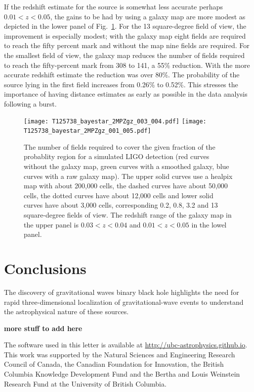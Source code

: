 \documentclass[useAMS,usenatbib]{mn2e}
\begin{document}
If the redshift estimate for the source is somewhat less accurate
perhaps $0.01<z<0.05$, the gains to be had by using a galaxy map are
more modest as depicted in the lower panel of Fig.~\ref{fig:bayestar}.
For the 13 square-degree field of view, the improvement is especially
modest; with the galaxy map eight fields are required to reach the
fifty percent mark and without the map nine fields are required.  For
the smallest field of view, the galaxy map reduces the number of
fields required to reach the fifty-percent mark from 308 to 141, a
55\% reduction.  With the more accurate redshift estimate the
reduction was over 80\%.  The probability of the source lying in the
first field increases from 0.26\% to 0.52\%.  This stresses the
importance of having distance estimates as early as possible in the
data analysis following a burst.
\begin{figure}
  \texttt{[image: T125738\_bayestar\_2MPZgz\_003\_004.pdf]}
  \texttt{[image: T125738\_bayestar\_2MPZgz\_001\_005.pdf]}
  \caption{The number of fields required to cover the given fraction
    of the probablity region for a simulated LIGO detection (red
    curves without the galaxy map, green curves with a smoothed
    galaxy, blue curves with a raw galaxy map).  The upper solid
    curves use a healpix map with about 200,000 cells, the dashed
    curves have about 50,000 cells, the dotted curves have about
    12,000 cells and lower solid curves have about 3,000 cells,
    corresponding 0.2, 0.8, 3.2 and 13 square-degree fields of
    view. The redshift range of the galaxy map in the upper panel is
    $0.03<z<0.04$ and $0.01<z<0.05$ in the lowel panel.}
  \label{fig:bayestar}
\end{figure}

\section{Conclusions}

The discovery of gravitational waves binary black hole highlights the
need for rapid three-dimensional localization of gravitational-wave
events to understand the astrophysical nature of these sources.

{\bf  more stuff to add here}

The software used in this letter is available at \url{http://ubc-astrophysics.github.io}.
This work was supported by the Natural Sciences and Engineering
Research Council of Canada, the Canadian Foundation for Innovation,
the British Columbia Knowledge Development Fund and the Bertha and
Louis Weinstein Research Fund at the University of British Columbia.






\label{lastpage}
\end{document}
